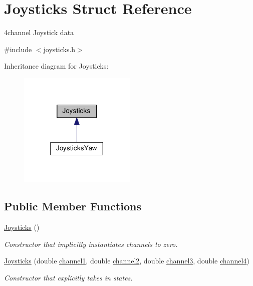 \hypertarget{structJoysticks}{\section{Joysticks Struct Reference}
\label{structJoysticks}
}


4channel Joystick data  




{\ttfamily \#include $<$joysticks.\-h$>$}



Inheritance diagram for Joysticks\-:\nopagebreak
\begin{figure}[H]
\begin{center}
\leavevmode
\includegraphics[width=158pt]{structJoysticks__inherit__graph}
\end{center}
\end{figure}
\subsection*{Public Member Functions}
\begin{DoxyCompactItemize}
\item 
\hyperlink{structJoysticks_a4326d4f2c4764a77b9f5c2e41aeae802}{Joysticks} ()
\begin{DoxyCompactList}\small\item\em Constructor that implicitly instantiates channels to zero. \end{DoxyCompactList}\item 
\hyperlink{structJoysticks_abe8777545ab8bbaa2282fa09e12041d9}{Joysticks} (double \hyperlink{structJoysticks_a3dc64d66808dddbf053033465777c493}{channel1}, double \hyperlink{structJoysticks_a14f4be76749f40ea8d75d579504ef932}{channel2}, double \hyperlink{structJoysticks_a2640f7dbb2364b8d92c464077c38ec56}{channel3}, double \hyperlink{structJoysticks_a154d66609cbfcb527d4dcf7473bf7af5}{channel4})
\begin{DoxyCompactList}\small\item\em Constructor that explicitly takes in states. \end{DoxyCompactList}\end{DoxyCompactItemize}
